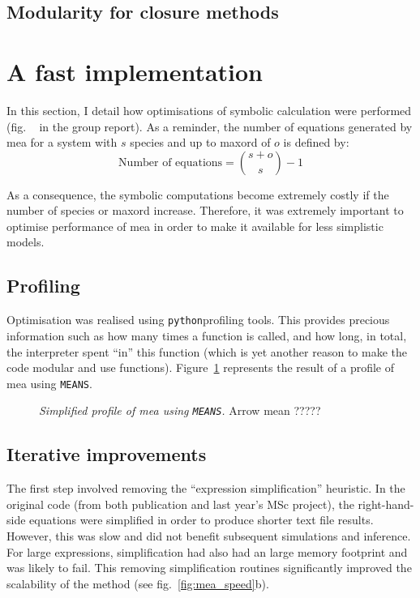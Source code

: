 \documentclass[11pt,a4paper]{article}
\newcommand{\means}{\texttt{MEANS}}
\newcommand{\py}{\texttt{python}}
\newcommand{\citationneeded}[2][]{\todo[color=brown, fancyline, #1]{\textbf{Citation Needed:} #2}}
\begin{document}
\subsection{Modularity for closure methods}

\section{A fast implementation}
In this section, I detail how optimisations of symbolic calculation were performed (fig. ~\citationneeded{find me} in the group report).
As a reminder, the number of equations generated by \gls{mea} for a system with $s$ species and up to \gls{maxord} of $o$
is defined by:
\begin{equation}
    \text{Number of equations} = {{s + o} \choose {s}} - 1
    \label{eq:number_of_equations}
\end{equation}

As a consequence, the symbolic computations become extremely costly if the number of species or \gls{maxord} increase.
Therefore, it was extremely important to optimise performance of \gls{mea} in order to make it available for less simplistic models.

\subsection{Profiling}
Optimisation was realised using \py profiling tools.
This provides precious information such as how many times a function is called, and how long, in total,
the interpreter spent ``in'' this function (which is yet another reason to make the code modular and use functions).
Figure~\ref{fig:profile} represents the result of a profile of \gls{mea} using \means.


\begin{figure}[tbh]
\caption{\emph{Simplified profile of \gls{mea} using  \means.}
Arrow mean ?????
}
\label{fig:profile}
\end{figure}

 
\subsection{Iterative improvements}




The first step involved removing the ``expression simplification'' heuristic.
In the original code (from both publication\cite{ale_general_2013} and last year's MSc project\cite{babtie_moment_2013}), 
the right-hand-side equations were simplified in order to produce shorter text file results.
However, this was slow and did not benefit subsequent simulations and inference.
For large expressions, simplification had also had an large memory footprint and was likely to fail.
This removing simplification routines significantly improved the scalability of the method (see fig.~\ref{fig:mea_speed}b).
\end{document}
